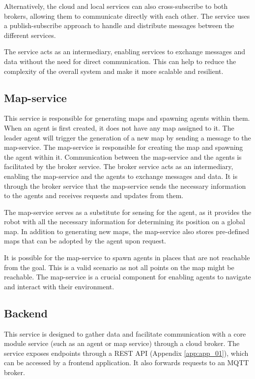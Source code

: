 Alternatively, the cloud and local services can also cross-subscribe to both brokers, allowing them to communicate directly with each other. The service uses a publish-subscribe approach to handle and distribute messages between the different services.

The service acts as an intermediary, enabling services to exchange messages and data without the need for direct communication. This can help to reduce the complexity of the overall system and make it more scalable and resilient.

\subsection{Map-service}
This service is responsible for generating maps and spawning agents within them. When an agent is first created, it does not have any map assigned to it. The leader agent will trigger the generation of a new map by sending a message to the map-service. The map-service is responsible for creating the map and spawning the agent within it. Communication between the map-service and the agents is facilitated by the broker service. The broker service acts as an intermediary, enabling the map-service and the agents to exchange messages and data. It is through the broker service that the map-service sends the necessary information to the agents and receives requests and updates from them.

The map-service serves as a substitute for sensing for the agent, as it provides the robot with all the necessary information for determining its position on a global map. In addition to generating new maps, the map-service also stores pre-defined maps that can be adopted by the agent upon request.

It is possible for the map-service to spawn agents in places that are not reachable from the goal. This is a valid scenario as not all points on the map might be reachable. The map-service is a crucial component for enabling agents to navigate and interact with their environment.

\subsection{Backend}
This service is designed to gather data and facilitate communication with a core module service (such as an agent or map service) through a cloud broker. The service exposes endpoints through a REST API (Appendix \ref{app:app_01}), which can be accessed by a frontend application. It also forwards requests to an MQTT broker.

